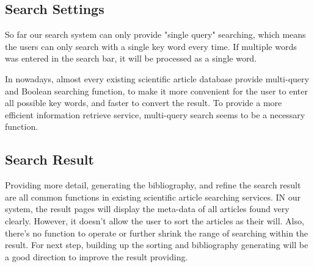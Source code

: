 \subsection{Search Settings}

So far our search system can only provide "single query" searching, which means the users can only search with a  single key word every time.
If multiple words was entered in the search bar, it will be processed as a single word.

In nowadays, almost every existing scientific article database provide multi-query and Boolean searching function,
to make it more convenient for the user to enter all possible key words,
and faster to convert the result.
To provide a more efficient information retrieve service,
multi-query search seems to be a necessary function.

\subsection{Search Result}
Providing more detail, generating the bibliography, and refine the search result are all common functions in existing scientific article searching services.
IN our system, the result pages will display the meta-data of all articles found very clearly.
However, it doesn't allow the user to sort the articles as their will. Also,
there's no function to operate or further shrink the range of searching within the result.
For next step,
building up the sorting and bibliography generating will be a good direction to improve the result providing.

